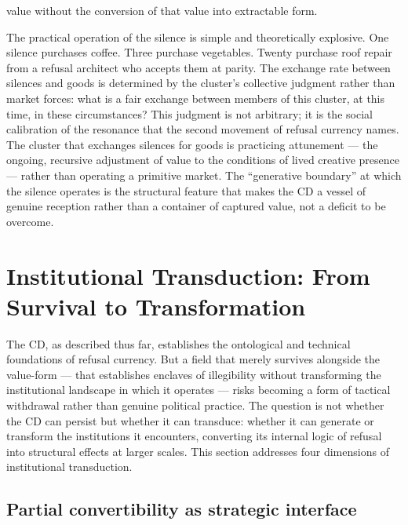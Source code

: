 value without the conversion of that value into extractable form.

The practical operation of the silence is simple and theoretically explosive. One silence purchases coffee. Three purchase vegetables. Twenty purchase roof repair from a refusal architect who accepts them at parity. The exchange rate between silences and goods is determined by the cluster’s collective judgment rather than market forces: what is a fair exchange between members of this cluster, at this time, in these circumstances? This judgment is not arbitrary; it is the social calibration of the resonance that the second movement of refusal currency names. The cluster that exchanges silences for goods is practicing attunement — the ongoing, recursive adjustment of value to the conditions of lived creative presence — rather than operating a primitive market. The “generative boundary” at which the silence operates is the structural feature that makes the CD a vessel of genuine reception rather than a container of captured value, not a deficit to be overcome.

\section{Institutional Transduction: From Survival to Transformation}

The CD, as described thus far, establishes the ontological and technical foundations of refusal currency. But a field that merely survives alongside the value-form — that establishes enclaves of illegibility without transforming the institutional landscape in which it operates — risks becoming a form of tactical withdrawal rather than genuine political practice. The question is not whether the CD can persist but whether it can transduce: whether it can generate or transform the institutions it encounters, converting its internal logic of refusal into structural effects at larger scales. This section addresses four dimensions of institutional transduction.

\subsection{Partial convertibility as strategic interface}

